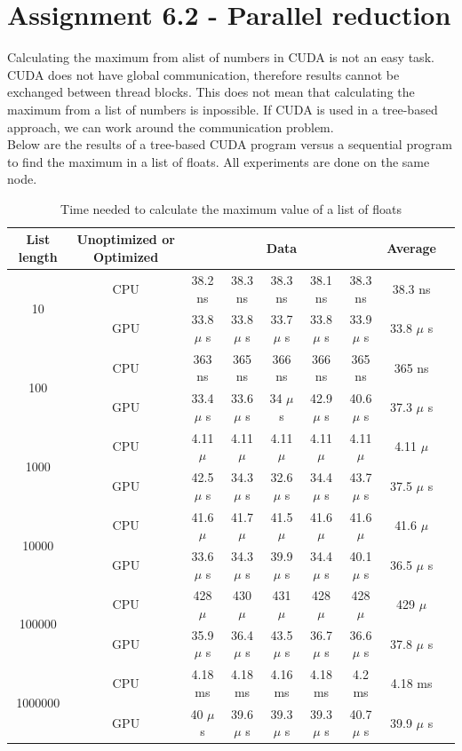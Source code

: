 \documentclass[a4paper]{article}
\begin{document}
\section{Assignment 6.2 - Parallel reduction}
  Calculating the maximum from alist of numbers in CUDA is not an easy task.
  CUDA does not have global communication, therefore results cannot be exchanged between thread blocks.
  This does not mean that calculating the maximum from a list of numbers is inpossible.
  If CUDA is used in a tree-based approach, we can work around the communication problem.\\
  Below are the results of a tree-based CUDA program versus a sequential
  program to find the maximum in a list of floats.
  All experiments are done on the same node.
  \begin{table}[H]
    \caption{Time needed to calculate the maximum value of a list of floats}
    \label{table:time}
    \begin{center}
	    \begin{tabular}{| c | c | c | c | c | c | c | c | c |}
	      \hline
	      List length & Unoptimized or Optimized & \multicolumn{5}{|c|}{Data} & Average\\
		    \hline
		    \multirow{2}{*}{10} & CPU & 38.2 ns & 38.3 ns & 38.3 ns & 38.1 ns & 38.3 ns & 38.3 ns\\ 
		    \cline{2-8}
		    & GPU & 33.8 $\mu$ s & 33.8 $\mu$ s & 33.7 $\mu$ s & 33.8 $\mu$ s & 33.9 $\mu$ s & 33.8 $\mu$ s\\ 
		    \hline
		    \multirow{2}{*}{100} & CPU & 363 ns & 365 ns & 366 ns & 366 ns & 365 ns & 365 ns\\ 
		    \cline{2-8}
		    & GPU & 33.4 $\mu$ s & 33.6 $\mu$ s & 34 $\mu$ s & 42.9 $\mu$ s & 40.6 $\mu$ s & 37.3 $\mu$ s\\ 
		    \hline
		    \multirow{2}{*}{1000} & CPU & 4.11 $\mu$ & 4.11 $\mu$ & 4.11 $\mu$ & 4.11 $\mu$ & 4.11 $\mu$ & 4.11 $\mu$ \\ 
		    \cline{2-8}
		    & GPU & 42.5 $\mu$ s & 34.3 $\mu$ s & 32.6 $\mu$ s & 34.4 $\mu$ s & 43.7 $\mu$ s & 37.5 $\mu$ s\\  
		    \hline
		    \multirow{2}{*}{10000} & CPU & 41.6 $\mu$ & 41.7 $\mu$ & 41.5 $\mu$ & 41.6 $\mu$ & 41.6 $\mu$ & 41.6 $\mu$ \\ 
		    \cline{2-8}
		    & GPU & 33.6 $\mu$ s & 34.3 $\mu$ s & 39.9 $\mu$ s & 34.4 $\mu$ s & 40.1 $\mu$ s & 36.5 $\mu$ s\\  
		    \hline
		    \multirow{2}{*}{100000} & CPU & 428 $\mu$ & 430 $\mu$ & 431 $\mu$ & 428 $\mu$ & 428 $\mu$ & 429 $\mu$ \\ 
		    \cline{2-8}
		    & GPU & 35.9 $\mu$ s & 36.4 $\mu$ s & 43.5 $\mu$ s & 36.7 $\mu$ s & 36.6 $\mu$ s & 37.8 $\mu$ s\\  
		    \hline
		    \multirow{2}{*}{1000000} & CPU & 4.18 ms & 4.18 ms & 4.16 ms & 4.18 ms & 4.2 ms & 4.18 ms\\ 
		    \cline{2-8}
		    & GPU & 40 $\mu$ s & 39.6 $\mu$ s & 39.3 $\mu$ s & 39.3 $\mu$ s & 40.7 $\mu$ s & 39.9 $\mu$ s\\ 
		    \hline
	    \end{tabular}
    \end{center}
  \end{table}
\end{document}
